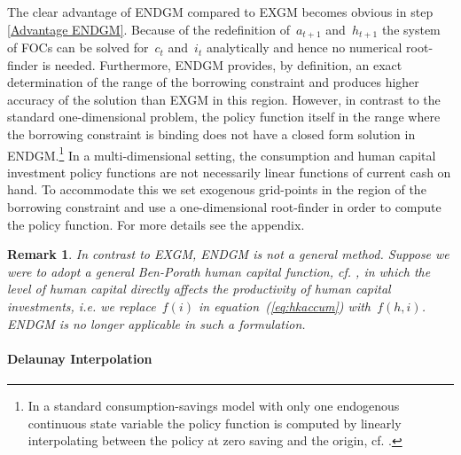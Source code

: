 \documentclass[a4paper,12pt]{article}%
\newtheorem{remark}[theorem]{Remark}
\begin{document}
The clear advantage of ENDGM compared to EXGM becomes obvious in step
\ref{Advantage ENDGM}. Because of the redefinition of~$a_{t+1}$ and~$h_{t+1}$
the system of FOCs can be solved for~$c_{t}$ and~$i_{t}$ analytically and
hence no numerical root-finder is needed. Furthermore, ENDGM provides, by
definition, an exact determination of the range of the borrowing constraint
and produces higher accuracy of the solution than EXGM in this region.
However, in contrast to the standard one-dimensional problem, the policy
function itself in the range where the borrowing constraint is binding does
not have a closed form solution in ENDGM.\footnote{In a standard
consumption-savings model with only one endogenous continuous state variable
the policy function is computed by linearly interpolating between the policy
at zero saving and the origin, cf.
%
.} In a multi-dimensional setting, the consumption and human capital
investment policy functions are not necessarily linear functions of current
cash on hand. To accommodate this we set exogenous grid-points in the region
of the borrowing constraint and use a one-dimensional root-finder in order to
compute the policy function. For more details see the appendix.

\begin{remark}
\label{rem:failureendgm} In contrast to EXGM, ENDGM is not a general method.
Suppose we were to adopt a general Ben-Porath human capital function, cf.
%
, in which the level of human capital directly affects the productivity of
human capital investments, i.e. we replace~$f(i)$ in
equation~(\ref{eq:hkaccum}) with~$f(h,i)$. ENDGM is no longer applicable in
such a formulation.
\end{remark}

\paragraph{Delaunay Interpolation}
\end{document}
